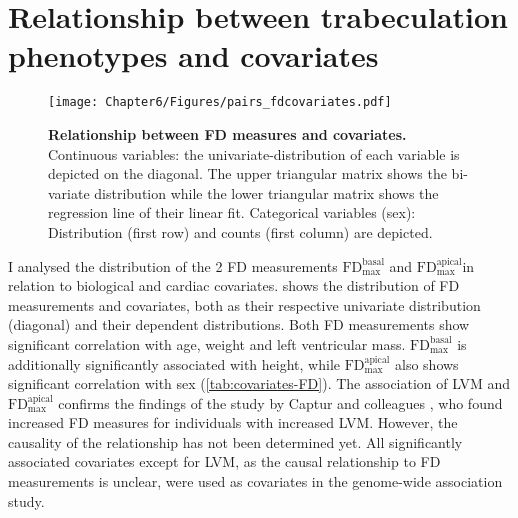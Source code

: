 \section{Relationship between trabeculation phenotypes and covariates}
\begin{figure}[hbtp]
	\centering
	\texttt{[image: Chapter6/Figures/pairs\_fdcovariates.pdf]}
	\caption[\textbf{Relationship between FD measures and covariates. }]{\textbf{Relationship between FD measures and covariates. }Continuous variables: the univariate-distribution of each variable is depicted on the diagonal. The upper triangular matrix shows the bi-variate distribution while the lower triangular matrix shows the regression line of their linear fit. Categorical variables (sex): Distribution (first row) and counts (first column) are depicted. } 
	 	\label{fig:covariates-FD}
\end{figure}

I analysed the distribution of the \num{2} FD measurements  \(\text{FD}_\text{max}^\text{basal}\) and \(\text{FD}_\text{max}^\text{apical}\)in relation to biological and cardiac covariates.  shows the distribution of FD measurements and covariates, both as their respective univariate distribution (diagonal) and their dependent distributions. Both FD measurements show significant correlation with age, weight and left ventricular mass.   \(\text{FD}_\text{max}^\text{basal}\) is additionally significantly associated with height, while  \(\text{FD}_\text{max}^\text{apical}\) also shows significant correlation with sex (\cref{tab:covariates-FD}). The association of LVM and \(\text{FD}_\text{max}^\text{apical}\)  confirms the findings of the study by Captur and colleagues \citep{Captur2014}, who found increased FD measures for individuals with increased LVM. However, the causality of the relationship has not been determined yet. All significantly associated covariates except for LVM, as the causal relationship to FD measurements is unclear, were used as covariates in the genome-wide association study. 

